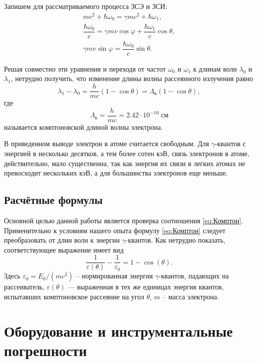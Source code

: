\documentclass[a4paper]{article}
\newcommand{\gmm}{$\gamma $}
\renewcommand{\epsilon}{\varepsilon}
\renewcommand{\phi}{\varphi}
\begin{document}
	Запишем для рассматриваемого процесса ЗСЭ и ЗСИ:
	\begin{gather*}\label{key}
		m c^2 + \hbar \omega_0 = \gamma m c^2 +\hbar \omega_1,\\
		\dfrac{\hbar \omega_0}{c} = \gamma m v \cos \phi + \dfrac{\hbar \omega_1}{c} \cos \theta,\\
		\gamma m v \sin \phi = \dfrac{\hbar \omega_0}{c} \sin \theta.
	\end{gather*}

	Решая совместно эти уравнения и переходя от частот $ \omega_0 $ и $ \omega_1 $ к	длинам волн $ \lambda_0 $ и $ \lambda_1 $, нетрудно получить, что изменение длины волны	рассеянного излучения равно
	\begin{equation}\label{eq:Комптон}
		\lambda_1 - \lambda_0 = \dfrac{h}{m c}\left(1- \cos \theta \right) = \Lambda_к \left(1- \cos \theta \right),
	\end{equation}
	где $$ \Lambda_к = \dfrac{h}{m c} = 2.42\cdot 10^{-10}\; см $$ называется комптоновской длиной волны электрона.
	
	В приведенном выводе электрон в атоме считается свободным. Для	\gmm-квантов с энергией в несколько десятков, а тем более сотен кэВ,	связь электронов в атоме, действительно,	мало существенна, так как энергия их связи в легких атомах не превосходит нескольких кэВ, а для большинства электронов еще меньше.
	
	\subsection{Расчётные формулы}
	
	Основной целью данной работы является проверка соотношения \eqref{eq:Комптон}. Применительно к условиям нашего опыта формулу \eqref{eq:Комптон} следует	преобразовать от длин волн к энергии \gmm-квантов. Как нетрудно показать, соответствующее выражение имеет вид
	\begin{equation}\label{eq:Комптон_нормир}
		\dfrac{1}{\epsilon(\theta)} - \dfrac{1}{\epsilon_0} = 1- \cos(\theta).
	\end{equation}
	Здесь $ \epsilon_0 = E_0/(m c^2) $  -- нормированная энергия \gmm-квантов, падающих на рассеиватель, $ \epsilon(\theta) $ — выраженная в тех же единицах энергия квантов, испытавших комптоновское рассеяние на угол $\theta$, $ m $ -- масса электрона.
	
	\section{Оборудование и инструментальные погрешности}
		
\end{document}
